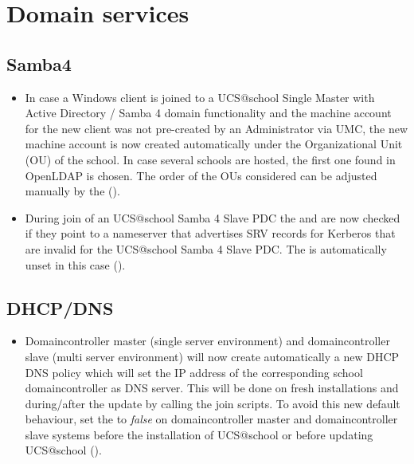 \section{Domain services}

\subsection{Samba4}
\begin{itemize}
\item In case a Windows client is joined to a UCS@school Single Master with Active Directory / Samba 4 domain functionality and the machine account for the new client was not pre-created by an Administrator via UMC, the new machine account is now created automatically under the Organizational Unit (OU) of the school. In case several schools are hosted, the first one found in OpenLDAP is chosen. The order of the OUs considered can be adjusted manually by the  ().
\item During join of an UCS@school Samba 4 Slave PDC the  and  are now checked if they point to a nameserver that advertises SRV records for Kerberos that are invalid for the UCS@school Samba 4 Slave PDC. The \ucsUCRV{} is automatically unset in this case ().
\end{itemize}

\subsection{DHCP/DNS}
\begin{itemize}
\item Domaincontroller master (single server environment) and domaincontroller slave (multi server
  environment) will now create automatically a new DHCP DNS policy which will set the IP address of the
  corresponding school domaincontroller as DNS server. This will be done on fresh installations and
  during/after the update by calling the join scripts. To avoid this new default behaviour, set the
   to \emph{false} on domaincontroller master
  and domaincontroller slave systems before the installation of UCS@school or before updating UCS@school
  ().
\end{itemize}



